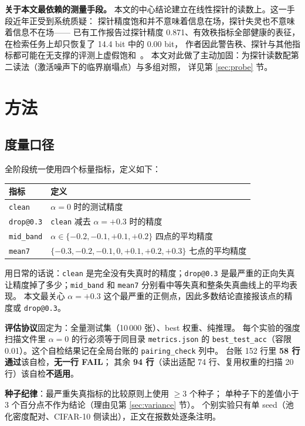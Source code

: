 \documentclass[11pt,a4paper]{ctexart}
\begin{document}
\textbf{关于本文最依赖的测量手段。}
本文的中心结论建立在线性探针的读数上。这一手段近年正受到系统质疑：
探针精度饱和并不意味着信息在场，探针失灵也不意味着信息不在场——
已有工作报告过探针精度 0.871、有效秩指标全部健康的表征，
在检索任务上却只恢复了 14.4 bit 中的 0.00 bit，
作者因此警告秩、探针与其他指标都可能在无支撑的评测上虚假饱和~\cite{gjepa}。
本文对此做了主动加固：为探针读数配第二读法（激活噪声下的临界崩塌点）与多组对照，
详见第 \ref{sec:probe} 节。

\section{方法}
\label{sec:method}

\subsection{度量口径}

全阶段统一使用四个标量指标，定义如下：

\begin{center}
\begin{tabular}{ll}
\toprule
指标 & 定义 \\
\midrule
\texttt{clean} & $\alpha=0$ 时的测试精度 \\
\texttt{drop@0.3} & \texttt{clean} 减去 $\alpha=+0.3$ 时的精度 \\
\texttt{mid\_band} & $\alpha\in\{-0.2,-0.1,+0.1,+0.2\}$ 四点的平均精度 \\
\texttt{mean7} & $\{-0.3,-0.2,-0.1,0,+0.1,+0.2,+0.3\}$ 七点的平均精度 \\
\bottomrule
\end{tabular}
\end{center}

用日常的话说：\texttt{clean} 是完全没有失真时的精度；\texttt{drop@0.3} 是最严重的正向失真让精度掉了多少；\texttt{mid\_band} 和 \texttt{mean7} 分别看中等失真和整条失真曲线上的平均表现。
本文最关心 $\alpha=+0.3$ 这个最严重的正侧点，因此多数结论直接报该点的精度或 \texttt{drop@0.3}。

\textbf{评估协议}固定为：全量测试集（10\,000 张）、best 权重、纯推理。
每个实验的强度扫描文件里 $\alpha=0$ 的行必须等于同目录 \texttt{metrics.json} 的
\texttt{best\_test\_acc}（容限 0.01）。这个自检结果记在全局台账的 \texttt{pairing\_check} 列中。
台账 152 行里 \textbf{58 行通过}该自检，\textbf{无一行 FAIL}；
其余 \textbf{94 行}（读出适配 74 行、复用权重的扫描 20 行）该自检\textbf{不适用}。

\textbf{种子纪律}：最严重失真指标的比较原则上使用 $\ge 3$ 个种子；
单种子下的差值小于 3 个百分点不作为结论（理由见第 \ref{sec:variance} 节）。
个别实验只有单 seed（池化密度配对、CIFAR-10 侧读出），正文在报数处逐条注明。
\end{document}
